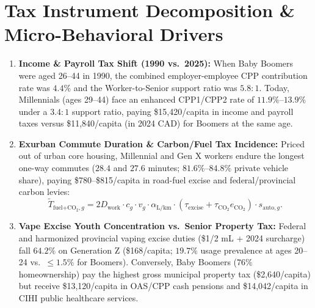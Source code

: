 \documentclass[11pt]{article}
\begin{document}
\section{Tax Instrument Decomposition \& Micro-Behavioral Drivers}
\begin{enumerate}
  \item \textbf{Income \& Payroll Tax Shift (1990 vs.\ 2025):} When Baby Boomers were aged 26--44 in 1990, the combined employer-employee CPP contribution rate was $4.4\%$ and the Worker-to-Senior support ratio was $5.8:1$. Today, Millennials (ages 29--44) face an enhanced CPP1/CPP2 rate of $11.9\%$--$13.9\%$ under a $3.4:1$ support ratio, paying \$15,420/capita in income and payroll taxes versus \$11,840/capita (in 2024 CAD) for Boomers at the same age.
  \item \textbf{Exurban Commute Duration \& Carbon/Fuel Tax Incidence:} Priced out of urban core housing, Millennial and Gen X workers endure the longest one-way commutes ($28.4$ and $27.6$ minutes; $81.6\%$--$84.8\%$ private vehicle share), paying \$780--\$815/capita in road-fuel excise and federal/provincial carbon levies:
  \begin{equation}
    \tilde{T}_{\text{fuel+CO}_2,g} = 2 D_{\text{work}} \cdot c_g \cdot v_g \cdot \alpha_{\text{L/km}} \cdot \left(\tau_{\text{excise}} + \tau_{\text{CO}_2} e_{\text{CO}_2}\right) \cdot s_{\text{auto},g}.
    \label{eq:commute-carbon}
  \end{equation}
  \item \textbf{Vape Excise Youth Concentration vs.\ Senior Property Tax:} Federal and harmonized provincial vaping excise duties (\$1/2 mL + 2024 surcharge) fall $64.2\%$ on Generation Z (\$168/capita; $19.7\%$ usage prevalence at ages 20--24 vs.\ $\leq 1.5\%$ for Boomers). Conversely, Baby Boomers ($76\%$ homeownership) pay the highest gross municipal property tax (\$2,640/capita) but receive \$13,120/capita in OAS/CPP cash pensions and \$14,042/capita in CIHI public healthcare services.
\end{enumerate}
\end{document}
